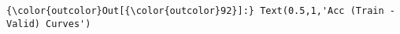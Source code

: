 \documentclass[11pt]{article}
\begin{document}
\begin{Verbatim}[commandchars=\\\{\}]
{\color{outcolor}Out[{\color{outcolor}92}]:} Text(0.5,1,'Acc (Train - Valid) Curves')
\end{Verbatim}
            
    \begin{center}
    \end{center}
    { \hspace*{\fill} \\}
    
    \begin{center}
    \end{center}
    { \hspace*{\fill} \\}
    

    
    
    
    
\end{document}
